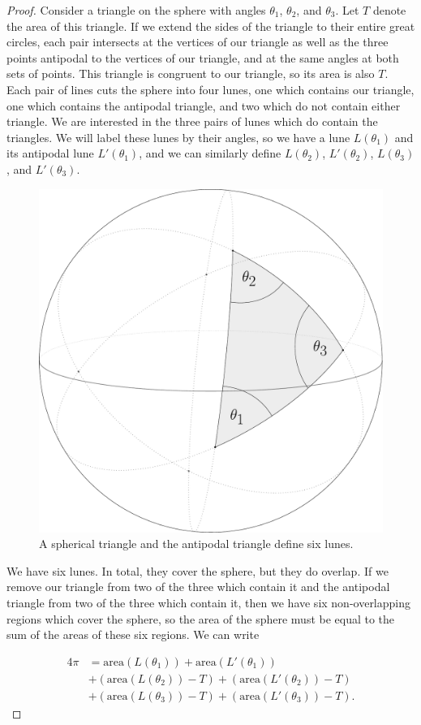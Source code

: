 \begin{proof}
	Consider a triangle on the sphere with angles $\theta_1$, $\theta_2$, and $\theta_3$.  Let $T$ denote the area of this triangle. If we extend the sides of the triangle to their entire great circles, each pair intersects at the vertices of our triangle as well as the three points antipodal to the vertices of our triangle, and at the same angles at both sets of points.  This triangle is congruent to our triangle, so its area is also $T$.  Each pair of lines cuts the sphere into four lunes, one which contains our triangle, one which contains the antipodal triangle, and two which do not contain either triangle.  We are interested in the three pairs of lunes which do contain the triangles.  We will label these lunes by their angles, so we have a lune $L(\theta_1)$ and its antipodal lune $L'(\theta_1)$, and we can similarly define $L(\theta_2)$, $L'(\theta_2)$, $L(\theta_3)$, and $L'(\theta_3)$.
	
	
	\begin{figure}[htb]
		\centering
		\includegraphics[width=.35\textwidth]{figs/trilune.pdf}
		\caption{A spherical triangle and the antipodal triangle define six lunes.}
		\label{fig:trilune}
	\end{figure}
	
	
	We have six lunes.  In total, they cover the sphere, but they do overlap.  If we remove our triangle from two of the three which contain it and the antipodal triangle from two of the three which contain it, then we have six non-overlapping regions which cover the sphere, so the area of the sphere must be equal to the sum of the areas of these six regions.  We can write
	
	\begin{align*}
	4\pi &= \mathrm{area}(L(\theta_1)) + \mathrm{area}(L'(\theta_1)) \\
	&+  (\mathrm{area}(L(\theta_2)) - T) + (\mathrm{area}(L'(\theta_2)) - T) \\
	&+ (\mathrm{area}(L(\theta_3)) - T)	 + (\mathrm{area}(L'(\theta_3)) - T).
	\end{align*}
	

\end{proof}
